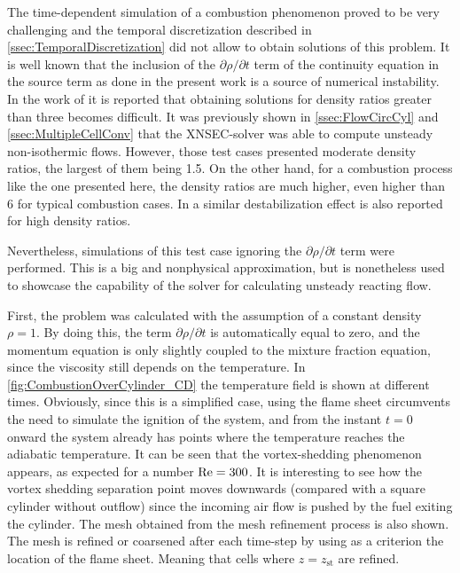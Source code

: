 The time-dependent simulation of a combustion phenomenon proved to be very challenging and the temporal discretization described in \cref{ssec:TemporalDiscretization} did not allow to obtain solutions of this problem. It is well known that the inclusion of the $\partial\rho /\partial t$ term of the continuity equation in the source term as done in the present work is a source of numerical instability. In the work of \textcite{nicoudNumericalStudyChannel} it is reported that obtaining solutions for density ratios greater than three  becomes difficult. It was previously shown in \cref{ssec:FlowCircCyl} and \cref{ssec:MultipleCellConv} that the XNSEC-solver was able to compute unsteady non-isothermic flows. However, those test cases presented moderate density ratios, the largest of them being 1.5. On the other hand, for a combustion process like the one presented here, the density ratios are much higher, even higher than 6 for typical combustion cases. In \textcite{rauwoensConservativeDiscreteCompatibilityconstraint2009} a similar destabilization effect is also reported for high density ratios. 

Nevertheless, simulations of this test case ignoring the  $\partial\rho /\partial t$ term were performed. This is a big and nonphysical approximation, but is nonetheless used to showcase the capability of the solver for calculating unsteady reacting flow.
 
First, the problem was calculated with the assumption of a constant density $\rho = 1$. By doing this, the term $\partial\rho /\partial t$ is automatically equal to zero, and the momentum equation is only slightly coupled to the mixture fraction equation, since the viscosity still depends on the temperature. 
In \cref{fig:CombustionOverCylinder_CD} the temperature field is shown at different times. Obviously, since this is a simplified case, using the flame sheet circumvents the need to simulate the ignition of the system, and from the instant $t=0$ onward the system already has points where the temperature reaches the adiabatic temperature. It can be seen that the vortex-shedding phenomenon appears, as expected for a number $ \text{Re} = 300$. It is interesting to see how the vortex shedding separation point moves downwards (compared with a square cylinder without outflow) since the incoming air flow is pushed by the fuel exiting the cylinder. The mesh obtained from the mesh refinement process is also shown. The mesh is refined or coarsened after each time-step by using as a criterion the location of the flame sheet. Meaning that cells where $z = z_{\text{st}}$ are refined.

